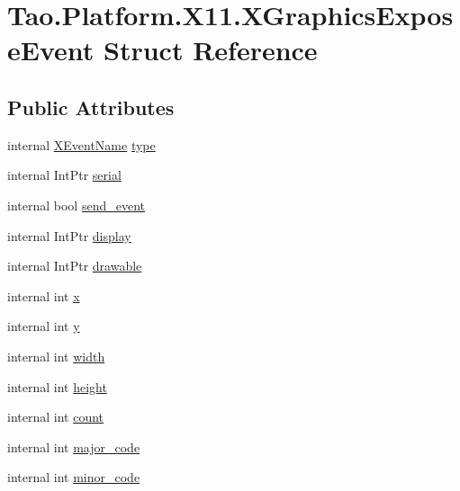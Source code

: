 \hypertarget{struct_tao_1_1_platform_1_1_x11_1_1_x_graphics_expose_event}{
\section{Tao.Platform.X11.XGraphicsExposeEvent Struct Reference}
\label{struct_tao_1_1_platform_1_1_x11_1_1_x_graphics_expose_event}
}
\subsection*{Public Attributes}
\begin{DoxyCompactItemize}
\item 
internal \hyperlink{namespace_tao_1_1_platform_1_1_x11_aff81ed5b8778e1ea8e872861dff9f146}{XEventName} \hyperlink{struct_tao_1_1_platform_1_1_x11_1_1_x_graphics_expose_event_a33c93862f0fc4a6c7324c6a89e944610}{type}
\item 
internal IntPtr \hyperlink{struct_tao_1_1_platform_1_1_x11_1_1_x_graphics_expose_event_a02b3f7de9b3208709f02424c6ff9b6e7}{serial}
\item 
internal bool \hyperlink{struct_tao_1_1_platform_1_1_x11_1_1_x_graphics_expose_event_a5fd63c5043da51c190dc456f0277f93c}{send\_\-event}
\item 
internal IntPtr \hyperlink{struct_tao_1_1_platform_1_1_x11_1_1_x_graphics_expose_event_a2b54307a6e955c03d5cb202c357ea546}{display}
\item 
internal IntPtr \hyperlink{struct_tao_1_1_platform_1_1_x11_1_1_x_graphics_expose_event_a8d168cda0f25d0f1a2ab749cc7a95d13}{drawable}
\item 
internal int \hyperlink{struct_tao_1_1_platform_1_1_x11_1_1_x_graphics_expose_event_af57a3dae62d2b2ee1e031a89d9c8ab04}{x}
\item 
internal int \hyperlink{struct_tao_1_1_platform_1_1_x11_1_1_x_graphics_expose_event_a363a405f45a91c13f7dae3ffe1f43c79}{y}
\item 
internal int \hyperlink{struct_tao_1_1_platform_1_1_x11_1_1_x_graphics_expose_event_a0cc6dc70a41720ef1fcf15cf1a9d21e0}{width}
\item 
internal int \hyperlink{struct_tao_1_1_platform_1_1_x11_1_1_x_graphics_expose_event_acab3dcf0f2a4dfdc238df55420d910be}{height}
\item 
internal int \hyperlink{struct_tao_1_1_platform_1_1_x11_1_1_x_graphics_expose_event_a756fcf445486d54e478c1be4007c0430}{count}
\item 
internal int \hyperlink{struct_tao_1_1_platform_1_1_x11_1_1_x_graphics_expose_event_ac38b69f95b913ce20c705ad170dd279e}{major\_\-code}
\item 
internal int \hyperlink{struct_tao_1_1_platform_1_1_x11_1_1_x_graphics_expose_event_a2ebd0a95301575e84d8318638b4780d7}{minor\_\-code}
\end{DoxyCompactItemize}


